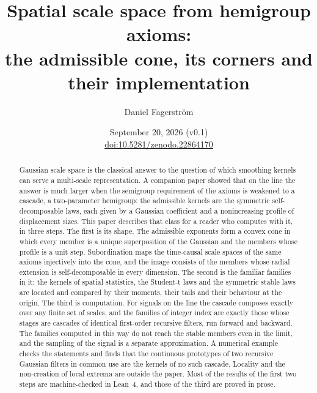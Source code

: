 \documentclass[11pt]{article}
\title{Spatial scale space from hemigroup axioms:\\
the admissible cone, its corners and their implementation}
\author{Daniel Fagerstr\"om}
\date{September 20, 2026 (v0.1)\\[3pt]
  {\normalsize \href{https://doi.org/10.5281/zenodo.22864170}{doi:10.5281/zenodo.22864170}}}
\numberwithin{equation}{section}
\theoremstyle{plain}
\theoremstyle{definition}
\theoremstyle{remark}
\begin{document}
\maketitle

\begin{abstract}
Gaussian scale space is the classical answer to the question of which smoothing kernels can
serve a multi-scale representation. A companion paper showed that on the line the answer is
much larger when the semigroup requirement of the axioms is weakened to a cascade, a
two-parameter hemigroup: the admissible kernels are the symmetric self-decomposable laws,
each given by a Gaussian coefficient and a nonincreasing profile of displacement sizes. This
paper describes that class for a reader who computes with it, in three steps. The first is
its shape. The admissible exponents form a convex cone in which every member is a unique
superposition of the Gaussian and the members whose profile is a unit step. Subordination maps
the time-causal scale spaces of the same axioms injectively into the cone, and the image
consists of the members whose radial extension is self-decomposable in every dimension. The
second is the familiar families in it: the \Matern{} kernels of spatial statistics, the
Student-t laws and the symmetric stable laws are located and compared by their moments, their
tails and their behaviour at the origin. The third is computation. For signals on the line the
cascade composes exactly over any finite set of scales, and the \Matern{} families of integer
index are exactly those whose stages are cascades of identical first-order recursive filters,
run forward and backward. The families computed in this way do not reach the stable members
even in the limit, and the sampling of the signal is a separate approximation. A numerical
example checks the statements and finds that the continuous prototypes of two recursive
Gaussian filters in common use are the kernels of no such cascade. Locality and the
non-creation of local extrema are outside the paper. Most of the results of the first two
steps are machine-checked in Lean~4, and those of the third are proved in prose.
\end{abstract}
\end{document}
